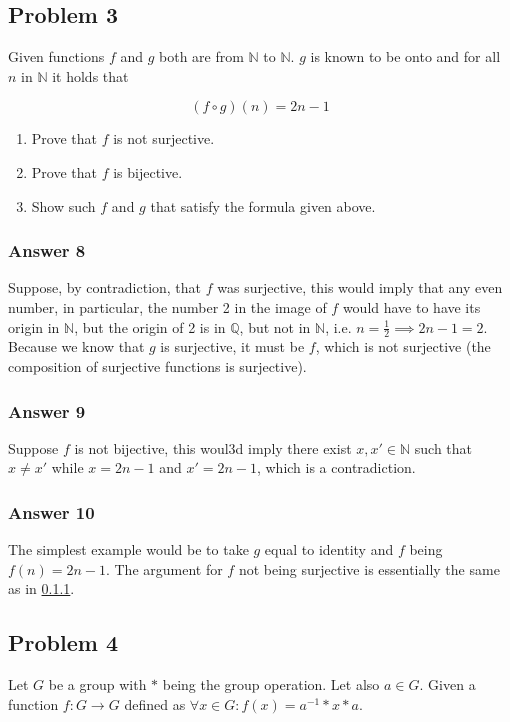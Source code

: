 \documentclass[11pt]{article}
\begin{document}
\subsection{Problem 3}
\label{sec-1-3}
Given functions $f$ and $g$ both are from $\mathbb{N}$ to $\mathbb{N}$.
$g$ is known to be onto and for all $n$ in $\mathbb{N}$ it holds that

\begin{equation*}
  (f \circ g)(n) = 2n - 1
\end{equation*}

\begin{enumerate}
\item Prove that $f$ is not surjective.
\item Prove that $f$ is bijective.
\item Show such $f$ and $g$ that satisfy the formula given above.
\end{enumerate}

\subsubsection{Answer 8}
\label{sec-1-3-1}
Suppose, by contradiction, that $f$ was surjective, this would imply
that any even number, in particular, the number 2 in the image of $f$
would have to have its origin in $\mathbb{N}$, but the origin of 2 is in
$\mathbb{Q}$, but not in $\mathbb{N}$, i.e.
$n = \frac{1}{2} \implies 2n - 1 = 2$.  Because we know that $g$ is
surjective, it must be $f$, which is not surjective (the composition
of surjective functions is surjective).
\subsubsection{Answer 9}
\label{sec-1-3-2}
Suppose $f$ is not bijective, this woul3d imply there exist
$x, x' \in \mathbb{N}$ such that $x \neq x'$ while $x = 2n - 1$
and $x' = 2n - 1$, which is a contradiction.
\subsubsection{Answer 10}
\label{sec-1-3-3}
The simplest example would be to take $g$ equal to identity and $f$
being $f(n) = 2n - 1$.  The argument for $f$ not being surjective is
essentially the same as in \ref{sec-1-3-1}.
\subsection{Problem 4}
\label{sec-1-4}
Let $G$ be a group with $*$ being the group operation.  Let also $a \in G$.
Given a function $f : G \to G$ defined as
$\forall x \in G: f(x) = a^{-1} * x * a$.
\end{document}
